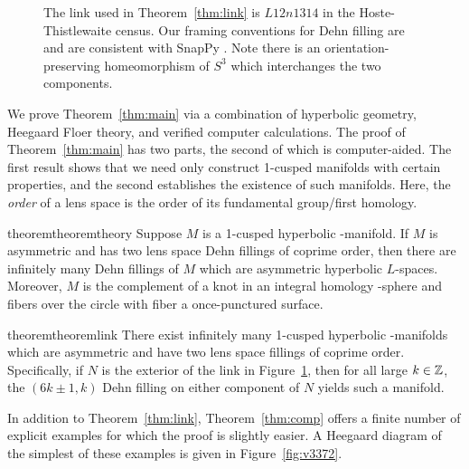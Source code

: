 \begin{figure}
  \begin{center}
  \end{center}
  \caption{The link used in Theorem~\ref{thm:link} is $L12n1314$ in
    the Hoste-Thistlewaite census. Our framing conventions for Dehn
    filling are
    \protect{} and are consistent
    with SnapPy \cite{SnapPy}.  Note there is an
    orientation-preserving homeomorphism of $S^3$ which interchanges
    the two components.  }\label{fig:link}
\end{figure}


We prove Theorem~\ref{thm:main} via a combination of hyperbolic
geometry, Heegaard Floer theory, and verified computer calculations.
The proof of Theorem~\ref{thm:main} has two parts, the second of which
is computer-aided.  The first result shows that we need only construct
1-cusped manifolds with certain properties, and the second establishes
the existence of such manifolds.  Here, the \emph{order} of a lens
space is the order of its fundamental group/first homology.

\begin{restatable*}{theorem}{theoremtheory}\label{thm:theory}
  Suppose $M$ is a 1-cusped hyperbolic \3-manifold.  If $M$ is
  asymmetric and has two lens space Dehn fillings of coprime order,
  then there are infinitely many Dehn fillings of $M$ which are
  asymmetric hyperbolic $L$-spaces. Moreover, $M$ is the complement of
  a knot in an integral homology \3-sphere and fibers over the circle
  with fiber a once-punctured surface.
\end{restatable*}

\begin{restatable*}{theorem}{theoremlink}\label{thm:link}
  There exist infinitely many 1-cusped hyperbolic \3-manifolds which
  are asymmetric and have two lens space fillings of coprime order.
  Specifically, if $N$ is the exterior of the link in
  Figure~\ref{fig:link}, then for all large $k \in {\mathbb Z}$, the $(6k\pm1,
  k)$ Dehn filling on either component of $N$ yields such a manifold.
\end{restatable*}
\noindent
In addition to Theorem~\ref{thm:link}, Theorem~\ref{thm:comp} 
offers a finite number of explicit examples for which the proof is
slightly easier.  A Heegaard diagram of the simplest of these examples
is given in Figure~\ref{fig:v3372}.  

